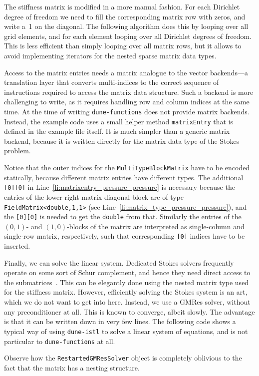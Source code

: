 \documentclass[a4paper,10pt,headings=normal,bibliography=totoc]{scrartcl}
\newcommand{\cpp}[1]{\lstinline[basicstyle=\ttfamily]!#1!}
\newcommand{\dunemodule}[1]{\texttt{#1}}
\begin{document}
The stiffness matrix is modified in a more manual fashion.  For each Dirichlet degree of freedom we need to fill the corresponding matrix row
with zeros, and write a~1 on the diagonal.
The following algorithm does this by looping over all grid elements, and for each element
looping over all Dirichlet degrees of freedom.  This is less efficient than simply
looping over all matrix rows, but it allows to avoid implementing iterators for the
nested sparse matrix data types.
%

%
Access to the matrix entries needs a matrix analogue to the vector backends---a translation
layer that converts multi-indices to the correct sequence of instructions required to
access the matrix data structure.  Such a backend is more challenging to write, as it
requires handling row and column indices at the same time.  At the time of writing \dunemodule{dune-functions}
does not provide matrix backends.  Instead, the example code uses a small helper method
\cpp{matrixEntry} that is defined in the example file itself.
It is much simpler than a generic matrix backend, because it is written
directly for the matrix data type of the Stokes problem.
%

%
Notice that the outer indices for the \cpp{MultiTypeBlockMatrix} have to be
encoded statically, because different matrix entries have different types.
The additional \cpp{[0][0]} in Line~\ref{li:matrixentry_pressure_pressure} is necessary
because the entries of the lower-right matrix diagonal block are of type \cpp{FieldMatrix<double,1,1>}
(see Line~\ref{li:matrix_type_pressure_pressure}), and the \cpp{[0][0]} is needed to get the \cpp{double} from that.
Similarly the entries of the $(0,1)$- and $(1,0)$-blocks of the matrix are
interpreted as single-column and single-row matrix, respectively, such that
corresponding \cpp{[0]} indices have to be inserted.

Finally, we can solve the linear system.
Dedicated Stokes solvers frequently operate on some sort of Schur complement,
and hence they need direct access to the submatrices~\cite{john:2016}.
This can be elegantly done using the nested matrix type used for the stiffness matrix.
However, efficiently solving the Stokes system is an art,
which we do not want to get into here.
Instead, we use a GMRes solver, without any preconditioner at all.  This is known to converge,
albeit slowly.
The advantage is that it can be written down in very few lines.
The following code shows a typical way of using \dunemodule{dune-istl} to solve
a linear system of equations, and is not particular to \dunemodule{dune-functions}
at all.
%

%
Observe how the \cpp{RestartedGMResSolver} object is completely oblivious to the fact that the matrix
has a nesting structure.
\end{document}
